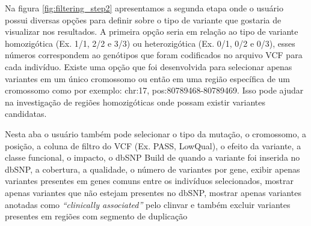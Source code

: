 

Na figura \ref{fig:filtering_step2} apresentamos a segunda etapa onde o usuário possui diversas opções para definir sobre o tipo de variante que gostaria de visualizar nos resultados. A primeira opção seria em relação ao tipo de variante homozigótica (Ex. 1/1, 2/2 e 3/3) ou heterozigótica (Ex. 0/1, 0/2 e 0/3), esses números correspondem ao genótipos que foram codificados no arquivo VCF para cada indivíduo. Existe uma opção que foi desenvolvida para selecionar apenas variantes em um único cromossomo ou então em uma região específica de um cromossomo como por exemplo: chr:17, pos:80789468-80789469. Isso pode ajudar na investigação de regiões homozigóticas onde possam existir variantes candidatas.

Nesta aba o usuário também pode selecionar o tipo da mutação, o cromossomo, a posição, a coluna de filtro do VCF (Ex. PASS, LowQual), o efeito da variante, a classe funcional, o impacto, o dbSNP Build de quando a variante foi inserida no dbSNP, a cobertura, a qualidade, o número de variantes por gene, exibir apenas variantes presentes em genes comuns entre os indivíduos selecionados, mostrar apenas variantes que não estejam presentes no dbSNP, mostrar apenas variantes anotadas como \textit{``clinically associated''} pelo clinvar e também excluir variantes presentes em regiões com segmento de duplicação


